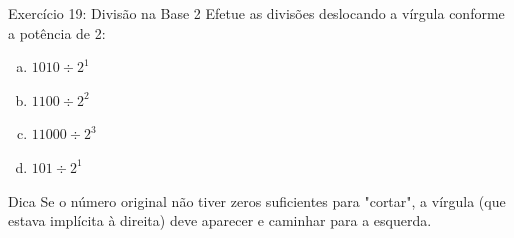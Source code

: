 \begin{frame}{Exercício 19: Divisão na Base 2}
    Efetue as divisões deslocando a vírgula conforme a potência de 2:

    \begin{enumerate}[a)]
        \item $1010 \div 2^1$
        \item $1100 \div 2^2$
        \item $11000 \div 2^3$
        \item $101 \div 2^1$
    \end{enumerate}

    \vspace{0.5cm}
    \begin{alertblock}{Dica}
        Se o número original não tiver zeros suficientes para "cortar", a vírgula (que estava implícita à direita) deve aparecer e caminhar para a esquerda.
    \end{alertblock}
\end{frame}

